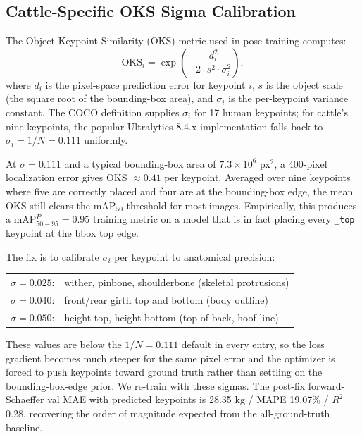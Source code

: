 \documentclass[conference]{IEEEtran}
\begin{document}
\subsection{Cattle-Specific OKS Sigma Calibration}
\label{sec:sigma}

The Object Keypoint Similarity (OKS) metric used in pose training computes:
\begin{equation}
\text{OKS}_i = \exp\!\left( - \frac{d_i^2}{2 \cdot s^2 \cdot \sigma_i^2} \right),
\label{eq:oks}
\end{equation}
where $d_i$ is the pixel-space prediction error for keypoint $i$, $s$ is the object scale (the square root of the bounding-box area), and $\sigma_i$ is the per-keypoint variance constant. The COCO definition supplies $\sigma_i$ for 17 human keypoints; for cattle's nine keypoints, the popular Ultralytics 8.4.x implementation falls back to $\sigma_i = 1/N = 0.111$ uniformly.

At $\sigma = 0.111$ and a typical bounding-box area of $7.3 \times 10^6$ px$^2$, a 400-pixel localization error gives OKS $\approx 0.41$ per keypoint. Averaged over nine keypoints where five are correctly placed and four are at the bounding-box edge, the mean OKS still clears the mAP$_{50}$ threshold for most images. Empirically, this produces a mAP$_{50-95}^P = 0.95$ training metric on a model that is in fact placing every \texttt{\_top} keypoint at the bbox top edge.

The fix is to calibrate $\sigma_i$ per keypoint to anatomical precision:
\begin{center}
\begin{tabular}{ll}
$\sigma = 0.025$: & wither, pinbone, shoulderbone (skeletal protrusions) \\
$\sigma = 0.040$: & front/rear girth top and bottom (body outline) \\
$\sigma = 0.050$: & height top, height bottom (top of back, hoof line) \\
\end{tabular}
\end{center}
These values are below the $1/N = 0.111$ default in every entry, so the loss gradient becomes much steeper for the same pixel error and the optimizer is forced to push keypoints toward ground truth rather than settling on the bounding-box-edge prior. We re-train with these sigmas. The post-fix forward-Schaeffer val MAE with predicted keypoints is 28.35 kg / MAPE 19.07\% / $R^2$ 0.28, recovering the order of magnitude expected from the all-ground-truth baseline.
\end{document}
